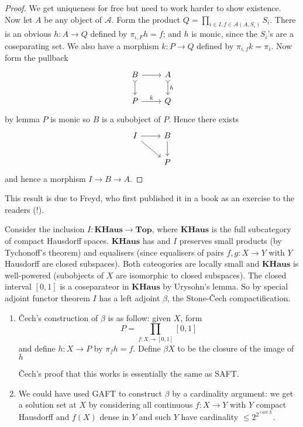 \documentclass[a4paper]{article}
\renewcommand{\c}[1]{\mathbf{#1}}
\begin{document}
\begin{proof}
  We get uniqueness for free but need to work harder to show existence. Now let \(A\) be any object of \(\mathcal A\). Form the product \(Q = \prod_{i \in I, f \in \mathcal A (A, S_i)} S_i\). There is an obvious \(h: A \to Q\) defined by \(\pi_{i, F} h = f\); and \(h\) is monic, since the \(S_i\)'s are a coseparating set. We also have a morphism \(k: P \to Q\) defined by \(\pi_{i, f} k = \pi_i\). Now form the pullback
   \[
     \begin{tikzcd}
       B \ar[r] \ar[d, rightarrowtail] & A \ar[d, "h", rightarrowtail] \\
       P \ar[r, "k"] & Q
     \end{tikzcd}
   \]
  by lemma \(P\) is monic so \(B\) is a subobject of \(P\). Hence there exists
  \[
    \begin{tikzcd}
      I \ar[r] \ar[dr] & B \ar[d] \\
      & P
    \end{tikzcd}
  \]
  and hence a morphism \(I \to B \to A\).
\end{proof}

This result is due to Freyd, who first published it in a book as an exercise to the readers (!).

\begin{eg}
  Consider the inclusion \(I: \c{KHaus} \to \c{Top}\), where \(\c{KHaus}\) is the full subcategory of compact Hausdorff spaces. \(\c{KHaus}\) has and \(I\) preserves small products (by Tychonoff's theorem) and equalisers (since equalisers of pairs \(f, g: X \to Y\) with \(Y\) Hausdorff are closed subspaces). Both cateogories are locally small and \(\c{KHaus}\) is well-powered (subobjects of \(X\) are isomorphic to closed subspaces). The closed interval \([0, 1]\) is a coseparateor in \(\c{KHaus}\) by Urysohn's lemma. So by special adjoint functor theorem \(I\) has a left adjoint \(\beta\), the Stone-Čech compactification.
\end{eg}

\begin{remark}\leavevmode
  \begin{enumerate}
  \item %

  Čech's construction of \(\beta\) is as follow: given \(X\), form
  \[
    P = \prod_{f: X \to [0, 1]} [0, 1]
  \]
  and define \(h: X \to P\) by \(\pi_f h = f\). Define \(\beta X\) to be the closure of the image of \(h\)


  Čech's proof that this works is essentially the same as SAFT.
\item We could have used GAFT to construct \(\beta\) by a cardinality argument: we get a solution set at \(X\) by considering all continuous \(f: X \to Y\) with \(Y\) compact Hausdorff and \(f(X)\) dense in \(Y\) and such \(Y\) have cardinality \(\leq 2^{2^{\operatorname{card} X}}\).
  \end{enumerate}
\end{remark}
\end{document}
